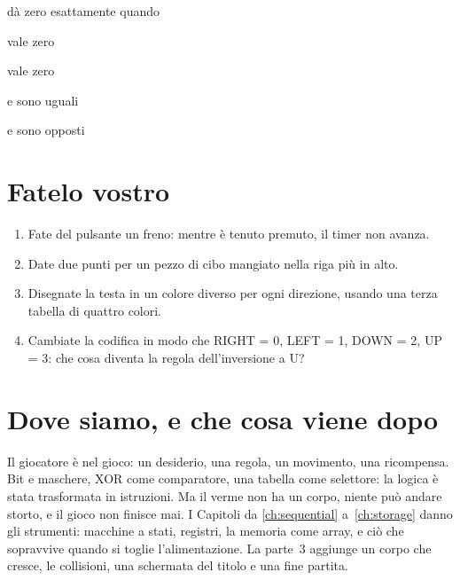 \begin{quiz}{ dà zero esattamente quando}
\item {} vale zero
\item {} vale zero
\item {} e  sono uguali
\item {} e  sono opposti
\end{quiz}

\section{Fatelo vostro}

\begin{exercise}[su \prg]
\begin{enumerate}[nosep]
\item Fate del pulsante  un freno: mentre è tenuto premuto, il timer non avanza.
\item Date due punti per un pezzo di cibo mangiato nella riga più in alto.
\item Disegnate la testa in un colore diverso per ogni direzione, usando una
  terza tabella di quattro colori.
\item Cambiate la codifica in modo che RIGHT = 0, LEFT = 1, DOWN = 2, UP = 3:
  che cosa diventa la regola dell'inversione a U?
\end{enumerate}
\end{exercise}

\section{Dove siamo, e che cosa viene dopo}

Il giocatore è nel gioco: un desiderio, una regola, un movimento, una
ricompensa. Bit e maschere, XOR come comparatore, una tabella come selettore:
la logica è stata trasformata in istruzioni. Ma il verme non ha un corpo,
niente può andare storto, e il gioco non finisce mai. I Capitoli da
\ref{ch:sequential} a~\ref{ch:storage} danno gli strumenti: macchine a stati,
registri, la memoria come array, e ciò che sopravvive quando si toglie
l'alimentazione. La parte~3 aggiunge un corpo che cresce, le collisioni, una
schermata del titolo e una fine partita.
